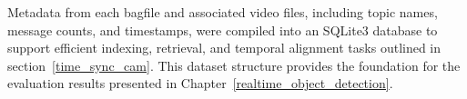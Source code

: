 \documentclass[../main.tex]{subfiles}
\begin{document}
Metadata from each bagfile and associated video files, including topic names, message counts, and timestamps, were compiled into an SQLite3 database to support efficient indexing, retrieval, and temporal alignment tasks outlined in section~\ref{time_sync_cam}.
This dataset structure provides the foundation for the evaluation results presented in Chapter~\ref{realtime_object_detection}.





\end{document}
